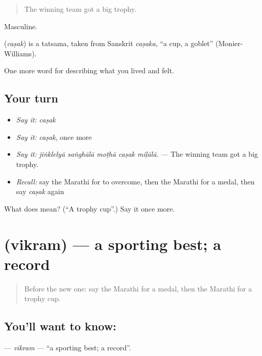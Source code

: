 \begin{quote}
The winning team got a big trophy.
\end{quote}

Masculine.

\begin{cousinweb}
\textbf{} (\emph{caṣak}) is a tatsama, taken from Sanskrit \emph{caṣaka}, \textquotedblleft{}a cup, a goblet\textquotedblright{} (Monier-Williams).
\end{cousinweb}

\begin{grammarlens}[title={What you've built}]
One more word for describing what you lived and felt.
\end{grammarlens}

\subsection*{Your turn}
\begin{itemize}
\raggedright
  \item \emph{Say it:} \emph{caṣak}
  \item \emph{Say it:} \emph{caṣak}, once more
  \item \emph{Say it:} \emph{jiṅklelyā saṅghālā moṭhā caṣak miḷālā.} — The winning team got a big trophy.
  \item \emph{Recall:} say the Marathi for to overcome, then the Marathi for a medal, then say \emph{caṣak} again
\end{itemize}

\begin{tcolorbox}[breakable,colback=teal!4,colframe=teal!35!black,title={Before you move on}]
What does  mean? (\textquotedblleft{}A trophy cup\textquotedblright{}.) Say it once more.
\end{tcolorbox}
\section[\texorpdfstring{\mr{विक्रम} (vikram)}{विक्रम (vikram)}]{ (vikram) — a sporting best; a record}

\label{lesson:MR-C530-vikram}



\begin{quote}
Before the new one: say the Marathi for a medal, then the Marathi for a trophy cup.
\end{quote}

\subsection*{You'll want to know: }
\textbf{} — \emph{vikram} — \textquotedblleft{}a sporting best; a record\textquotedblright{}.

